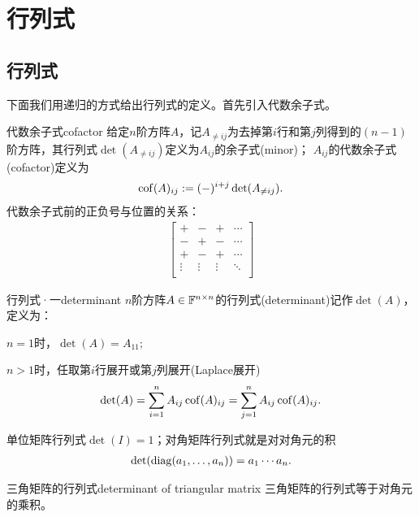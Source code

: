 \chapter{行列式}

\section{行列式}

下面我们用递归的方式给出行列式的定义。首先引入代数余子式。

\begin{definition}{代数余子式}{cofactor}
	给定$n$阶方阵$A$，记$A_{\neq ij}$为去掉第$i$行和第$j$列得到的$(n-1)$阶方阵，其行列式$\det(A_{\neq ij})$定义为$A_{ij}$的余子式(minor)；
	$A_{ij}$的代数余子式(cofactor)定义为
	\begin{align}
		\operatorname{cof}(A)_{ij}:=(-)^{i+j}\det(A_{\neq ij}).
	\end{align}
	代数余子式前的正负号与位置的关系：
	\begin{align}
		\begin{bmatrix}
			+&-&+&\cdots\\
			-&+&-&\cdots\\
			+&-&+&\cdots\\
			\vdots&\vdots&\vdots&\ddots\\
		\end{bmatrix}
	\end{align}
\end{definition}
\begin{definition}{行列式·一}{determinant}
	$n$阶方阵$A\in\mathbb F^{n\times n}$的行列式(determinant)记作$\det(A)$，定义为：
	\begin{compactenum}
		\item $n=1$时，$\det(A)=A_{11};$
		\item $n>1$时，任取第$i$行展开或第$j$列展开(Laplace展开)
		\begin{align}
			\det(A) = \sum_{i=1}^nA_{ij}\operatorname{cof}(A)_{ij} = \sum_{j=1}^nA_{ij}\operatorname{cof}(A)_{ij}.
		\end{align}
	\end{compactenum}
\end{definition}
\begin{corollary}
	单位矩阵行列式$\det(I)=1$；对角矩阵行列式就是对对角元的积
	\begin{align}
		\det(\operatorname{diag}(a_1,\ldots,a_n))=a_1\cdots a_n.
	\end{align}
\end{corollary}
\begin{theorem}
	{三角矩阵的行列式}{determinant of triangular matrix}
	三角矩阵的行列式等于对角元的乘积。
\end{theorem}

